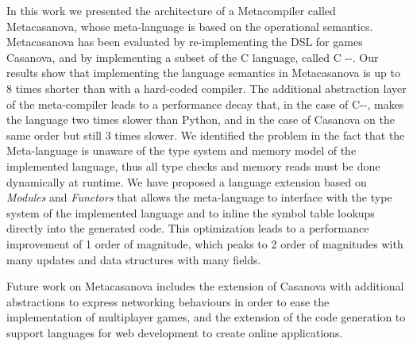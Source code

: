 In this work we presented the architecture of a Metacompiler called Metacasanova, whose meta-language is based on the operational semantics. Metacasanova has been evaluated by re-implementing the DSL for games Casanova, and by implementing a subset of the C language, called C -{}-. Our results show that implementing the language semantics in Metacasanova is up to 8 times shorter than with a hard-coded compiler. The additional abstraction layer of the meta-compiler leads to a performance decay that, in the case of C-{}-, makes the language two times slower than Python, and in the case of Casanova on the same order but still 3 times slower. We identified the problem in the fact that the Meta-language is unaware of the type system and memory model of the implemented language, thus all type checks and memory reads must be done dynamically at runtime. We have proposed a language extension based on \textit{Modules} and \textit{Functors} that allows the meta-language to interface with the type system of the implemented language and to inline the symbol table lookups directly into the generated code. This optimization leads to a performance improvement of 1 order of magnitude, which peaks to 2 order of magnitudes with many updates and data structures with many fields. 

Future work on Metacasanova includes the extension of Casanova with additional abstractions to express networking behaviours in order to ease the implementation of multiplayer games, and the extension of the code generation to support languages for web development to create online applications.